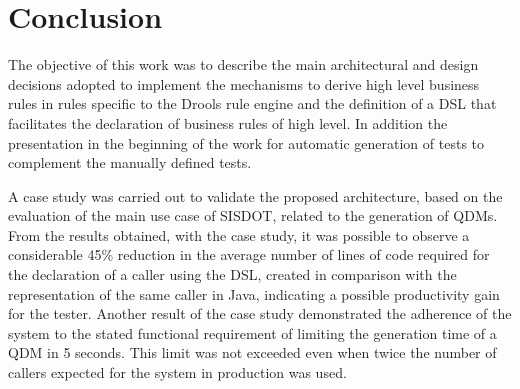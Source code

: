 \section{Conclusion}
\label{sec:conclusao}


The objective of this work was to describe the main architectural and design decisions adopted to implement the mechanisms to derive high level business rules in rules specific to the Drools rule engine and the definition of a DSL that facilitates the declaration of business rules of high level. In addition the presentation in the beginning of the work for automatic generation of tests to complement the manually defined tests.


A case study was carried out to validate the proposed architecture, based on the evaluation of the main use case of SISDOT, related to the generation of QDMs. From the results obtained, with the case study, it was possible to observe a considerable 45\% reduction in the average number of lines of code required for the declaration of a caller using the DSL, created in comparison with the representation of the same caller in Java, indicating a possible productivity gain for the tester. Another result of the case study demonstrated the adherence of the system to the stated functional requirement of limiting the generation time of a QDM in 5 seconds. This limit was not exceeded even when twice the number of callers expected for the system in production was used.

